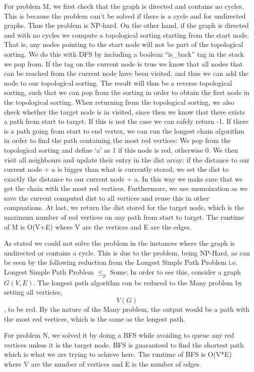 \documentclass{tufte-handout}
\begin{document}
For problem M, we first check that the graph is directed and contains no cycles. This is because the problem can’t be solved if there is a cycle and for undirected graphs. Thus the problem is NP-hard. On the other hand, if the graph is directed and with no cycles we compute a topological sorting starting from the start node. That is, any nodes pointing to the start node will not
 be part of the topological sorting. We do this with DFS by including a boolean “is\_back” tag in the stack we pop from. If the tag on the current node is true we know that all nodes that can be reached from the current node have been visited, and thus we can add the node to our topological sorting. The result will thus be a reverse topological sorting, 
such that we can pop from the sorting in order to obtain the first node in the topological sorting. When returning from the topological sorting, we also check whether the target node is in visited, since then we know that there exists a path from start to target. If this is not the case we can safely return
 -1. If there is a path going from start to end vertex, we can run the longest chain algorithm in order to find the path containing the most red vertices: We pop from the topological sorting and define ‘a’ as 1 if this node is red, otherwise 0. We then visit all neighbours and update their entry in the dist array: if the distance to our current node + a is bigger
 than what is currently stored, we set the dist to exactly the distance to our current node + a. In this way we make sure that we get the chain with the most red vertices. Furthermore, we use memoization as we save the current computed dist to all vertices and reuse this in other compuations. At last, we return the dist stored for the target node, which is the maximum number of red vertices on any path from start to target. The runtime of M is O(V+E) where V are the vertices and E are the edges.
 
As stated we could not solve the problem in the instances where the graph is undirected or contains a cycle. This is due to the problem, being NP-Hard, as can be seen by the following reduction from the Longest Simple Path Problem i.e. Longest Simple Path Problem $\leq_p$ Some: In order to see this, consider a graph $G(V,E)$. The longest path algorithm can be reduced to the Many problem by setting all verticies, $$V(G)$$, to be red. By the nature of the Many problem, the output would be a path with the most red vertices, which is the same as the longest path. 

For problem N, we solved it by doing a BFS while avoiding to queue any red vertices unless it is the target node. BFS is guaranteed
to find the shortest path which is what we are trying to achieve here.
The runtime of BFS is O(V*E) where V are the number of vertices and E is the number of edges.
\end{document}
